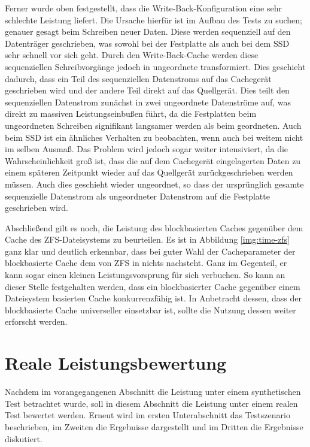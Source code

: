 Ferner wurde oben festgestellt, dass die Write-Back-Konfiguration eine sehr schlechte Leistung liefert. Die Ursache hierfür ist im Aufbau des Tests zu suchen;
genauer gesagt beim Schreiben neuer Daten. Diese werden sequenziell auf den Datenträger geschrieben, was sowohl bei der Festplatte als auch bei dem \ac{SSD} sehr
schnell vor sich geht. Durch den Write-Back-Cache werden diese sequenziellen Schreibvorgänge jedoch in ungeordnete transformiert. Dies geschieht dadurch, dass
ein Teil des sequenziellen Datenstroms auf das Cachegerät geschrieben wird und der andere Teil direkt auf das Quellgerät. Dies teilt den sequenziellen Datenstrom
zunächst in zwei ungeordnete Datenströme auf, was direkt zu massiven Leistungseinbußen führt, da die Festplatten beim ungeordneten Schreiben signifikant
langsamer werden als beim geordneten. Auch beim \ac{SSD} ist ein ähnliches Verhalten zu beobachten, wenn auch bei weitem nicht im selben Ausmaß. Das Problem wird
jedoch sogar weiter intensiviert, da die Wahrscheinlichkeit groß ist, dass die auf dem Cachegerät eingelagerten Daten zu einem späteren Zeitpunkt wieder auf das
Quellgerät zurückgeschrieben werden müssen. Auch dies geschieht wieder ungeordnet, so dass der ursprünglich gesamte sequenzielle Datenstrom als ungeordneter
Datenstrom auf die Festplatte geschrieben wird.

Abschließend gilt es noch, die Leistung des blockbasierten Caches gegenüber dem Cache des ZFS-Dateisystems zu beurteilen. Es ist in Abbildung \ref{img:time-zfs}
ganz klar und deutlich erkennbar, dass bei guter Wahl der Cacheparameter der blockbasierte Cache dem von ZFS in nichts nachsteht. Ganz im Gegenteil, er kann
sogar einen kleinen Leistungsvorsprung für sich verbuchen. So kann an dieser Stelle festgehalten werden, dass ein blockbasierter Cache gegenüber einem
Dateisystem basierten Cache konkurrenzfähig ist. In Anbetracht dessen, dass der blockbasierte Cache universeller einsetzbar ist, sollte die Nutzung dessen weiter
erforscht werden.

\section{Reale Leistungsbewertung}
\label{chap7:boot}

Nachdem im vorangegangenen Abschnitt die Leistung unter einem synthetischen Test betrachtet wurde, soll in diesem Abschnitt die Leistung unter einem realen Test
bewertet werden. Erneut wird im ersten Unterabschnitt das Testszenario beschrieben, im Zweiten die Ergebnisse dargestellt und im Dritten die Ergebnisse
diskutiert.

